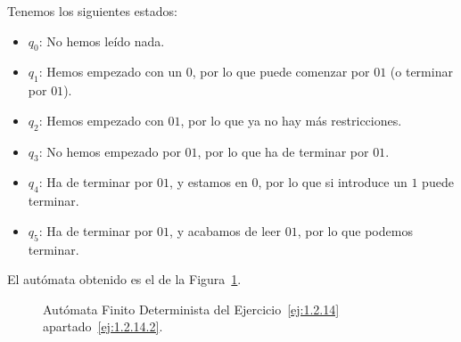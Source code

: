 \begin{ejercicio}
\begin{enumerate}
        Tenemos los siguientes estados:
        \begin{itemize}
            \item \ul{$q_0$}: No hemos leído nada.
            \item \ul{$q_1$}: Hemos empezado con un $0$, por lo que puede comenzar por $01$ (o terminar por $01$).
            \item \ul{$q_2$}: Hemos empezado con $01$, por lo que ya no hay más restricciones.
            \item \ul{$q_3$}: No hemos empezado por $01$, por lo que ha de terminar por $01$.
            \item \ul{$q_4$}: Ha de terminar por $01$, y estamos en $0$, por lo que si introduce un $1$ puede terminar.
            \item \ul{$q_5$}: Ha de terminar por $01$, y acabamos de leer $01$, por lo que podemos terminar.
        \end{itemize}

        El autómata obtenido es el de la Figura~\ref{fig:ej:1.2.14.2}.
        \begin{figure}
            \centering
            \caption{Autómata Finito Determinista del Ejercicio~\ref{ej:1.2.14} apartado~\ref{ej:1.2.14.2}.}
            \label{fig:ej:1.2.14.2}
        \end{figure}


\end{enumerate}
\end{ejercicio}
